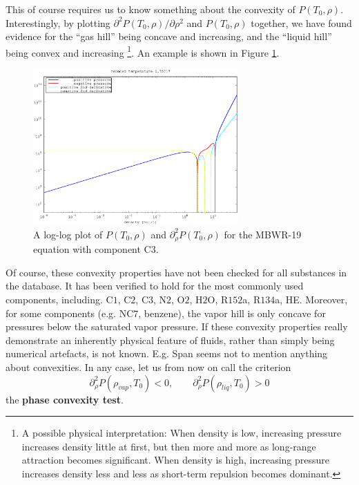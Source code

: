 \documentclass[internal,english]{sintefmemo2012}
\numberwithin{equation}{section}
\begin{document}
This of course requires us to know something about the convexity of $P(T_0,\rho)$. Interestingly, by plotting
$\partial^2P(T_0,\rho)/\partial\rho^2$ and $P(T_0,\rho)$ together, we have found evidence
for the ``gas hill'' being concave and increasing, and the ``liquid
hill'' being convex and increasing%
\footnote{A possible physical interpretation: When density is
  low, increasing pressure increases density little at first, but then
  more and more as long-range attraction becomes significant. When
  density is high, increasing pressure increases density less and less
  as short-term repulsion becomes dominant.}. %
An example is shown in Figure \ref{convexityPlot}.
\begin{figure}[h]
  \centering
  \includegraphics[width=0.7\textwidth]{figures/convexity.eps}
  \caption{A log-log plot of $P(T_0,\rho)$ and $\partial_\rho^2P(T_0,\rho)$ for the MBWR-19 equation with component C$3$.}
  \label{convexityPlot}
\end{figure}
Of course, these convexity properties have not been checked for all
substances in the database. It has been verified to hold for the most
commonly used components, including. C$1$, C$2$, C$3$, N$2$, O$2$,
H$2$O, R$152$a, R$134$a, HE. Moreover, for some components
(e.g. NC$7$, benzene), the vapor hill is only concave for pressures
below the saturated vapor pressure. If these convexity properties
really demonstrate an inherently physical feature of fluids, rather
than simply being numerical artefacts, is not known. E.g. Span
\cite{Span03} seems not to mention anything about convexities. In any
case, let us from now on call the criterion
\begin{equation}
  \partial_\rho^2 P(\rho_{vap},T_0) < 0, \qquad \partial_\rho^2 P(\rho_{liq},T_0) > 0
\end{equation}
the \textbf{phase convexity test}.
\end{document}
